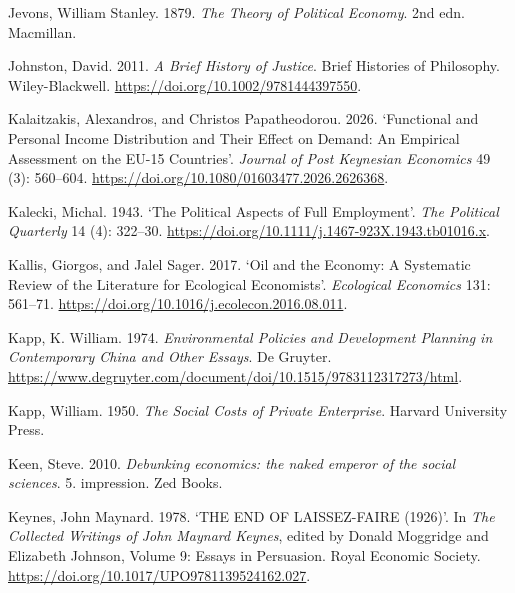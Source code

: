 \documentclass[
  british,
  a4paper,
  DIV=11,
  numbers=noendperiod,
  oneside,
  openany]{scrreprt}
\newlength{\cslhangindent}
\newenvironment{CSLReferences}[2] %
 {\begin{list}{}{%
  \setlength{\itemindent}{0pt}
  \setlength{\leftmargin}{0pt}
  \setlength{\parsep}{0pt}
  \ifodd #1
   \setlength{\leftmargin}{\cslhangindent}
   \setlength{\itemindent}{-1\cslhangindent}
  \fi
  \setlength{\itemsep}{#2\baselineskip}}}
 {\end{list}}
\begin{document}
\begin{CSLReferences}{1}{1}
Jevons, William Stanley. 1879. \emph{The Theory of Political Economy}.
2nd edn. Macmillan.

Johnston, David. 2011. \emph{A {Brief} {History} of {Justice}}. Brief
{Histories} of {Philosophy}. Wiley-Blackwell.
\url{https://doi.org/10.1002/9781444397550}.

Kalaitzakis, Alexandros, and Christos Papatheodorou. 2026. {`Functional
and Personal Income Distribution and Their Effect on Demand: An
Empirical Assessment on the {EU}-15 Countries'}. \emph{Journal of Post
Keynesian Economics} 49 (3): 560--604.
\url{https://doi.org/10.1080/01603477.2026.2626368}.

Kalecki, Michal. 1943. {`The {Political} {Aspects} of {Full}
{Employment}'}. \emph{The Political Quarterly} 14 (4): 322--30.
\url{https://doi.org/10.1111/j.1467-923X.1943.tb01016.x}.

Kallis, Giorgos, and Jalel Sager. 2017. {`Oil and the Economy: A
Systematic Review of the Literature for Ecological Economists'}.
\emph{Ecological Economics} 131: 561--71.
\url{https://doi.org/10.1016/j.ecolecon.2016.08.011}.

Kapp, K. William. 1974. \emph{Environmental Policies and Development
Planning in Contemporary China and Other Essays}. De Gruyter.
\url{https://www.degruyter.com/document/doi/10.1515/9783112317273/html}.

Kapp, William. 1950. \emph{The Social Costs of Private Enterprise}.
Harvard University Press.

Keen, Steve. 2010. \emph{Debunking economics: the naked emperor of the
social sciences}. 5. impression. Zed Books.

Keynes, John Maynard. 1978. {`{THE} {END} {OF} {LAISSEZ}-{FAIRE}
(1926)'}. In \emph{The {Collected} {Writings} of {John} {Maynard}
{Keynes}}, edited by Donald Moggridge and Elizabeth Johnson, Volume 9:
Essays in Persuasion. Royal Economic Society.
\url{https://doi.org/10.1017/UPO9781139524162.027}.


\end{CSLReferences}
\end{document}
